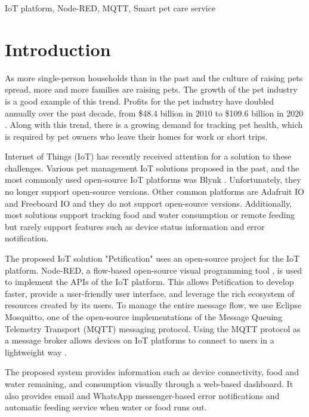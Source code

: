 \documentclass[conference]{IEEEtran}
\begin{document}
\begin{IEEEkeywords}
IoT platform, Node-RED, MQTT, Smart pet care service 
\end{IEEEkeywords}

\section{Introduction}
As more single-person households than in the past and the culture of raising pets spread, more and more families are raising pets.
The growth of the pet industry is a good example of this trend. Profits for the pet industry have doubled annually over the past decade, from \$48.4 billion in 2010 to \$109.6 billion in 2020 \cite{b1}.
Along with this trend, there is a growing demand for tracking pet health, which is required by pet owners who leave their homes for work or short trips. 

Internet of Things (IoT) has recently received attention for a solution to these challenges.
Various pet management IoT solutions proposed in the past, and 
the most commonly used open-source IoT platforms was Blynk \cite{b2, b3, b4}. Unfortunately, they no longer support open-source versions. Other common platforms  are Adafruit IO \cite{b5} and Freeboard IO \cite{b6} and they do not support open-source versions.
Additionally, most solutions support tracking food and water consumption or remote feeding but rarely support features such as device status information and error notification.

The proposed IoT solution "Petification" uses an open-source project for the IoT platform.
Node-RED, a flow-based open-source visual programming tool \cite{b7},  is used to implement the APIs of the IoT platform.
This allows Petification to develop faster, provide a user-friendly user interface, and leverage the rich ecosystem of resources created by its users.
To manage the entire message flow, we use Eclipse Mosquitto, one of the open-source implementations of the Message Queuing Telemetry Transport (MQTT) messaging protocol.
Using the MQTT protocol as a message broker allows devices on IoT platforms to connect to users in a lightweight way \cite{b8}.

The proposed system provides information such as device connectivity, food and water remaining, and consumption visually through a web-based dashboard.
It also provides email and WhatsApp messenger-based error notifications and automatic feeding service when water or food runs out.
\end{document}
